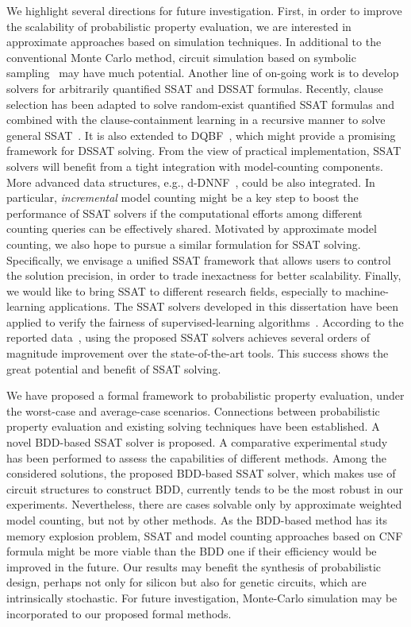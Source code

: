 We highlight several directions for future investigation.
First, in order to improve the scalability of probabilistic property evaluation,
we are interested in approximate approaches based on simulation techniques.
In additional to the conventional Monte Carlo method,
circuit simulation based on symbolic sampling~\cite{KravetsDAC19ECOSampling} may have much potential.
Another line of on-going work is to develop solvers for arbitrarily quantified SSAT and DSSAT formulas.
Recently, clause selection has been adapted to solve random-exist quantified SSAT formulas
and combined with the clause-containment learning in a recursive manner to solve general SSAT~\cite{Chen2021}.
It is also extended to DQBF~\cite{Tentrup2019},
which might provide a promising framework for DSSAT solving.
From the view of practical implementation,
SSAT solvers will benefit from a tight integration with model-counting components.
More advanced data structures, e.g., d-DNNF~\cite{Darwiche2001,Darwiche2002dDNNF}, could be also integrated.
In particular, \textit{incremental} model counting might be a key step to boost the performance of SSAT solvers
if the computational efforts among different counting queries can be effectively shared.
Motivated by approximate model counting,
we also hope to pursue a similar formulation for SSAT solving.
Specifically, we envisage a unified SSAT framework that allows users to control the solution precision,
in order to trade inexactness for better scalability.
Finally, we would like to bring SSAT to different research fields, especially to machine-learning applications.
The SSAT solvers developed in this dissertation have been applied to verify the fairness of supervised-learning algorithms~\cite{Ghosh2021}.
According to the reported data~\cite{Ghosh2021},
using the proposed SSAT solvers achieves several orders of magnitude improvement over the state-of-the-art tools.
This success shows the great potential and benefit of SSAT solving.

\iffalse
    We have proposed a formal framework to probabilistic property
    evaluation, under the worst-case and average-case scenarios.
    Connections between probabilistic property evaluation and existing
    solving techniques have been established. A novel BDD-based SSAT solver is proposed. A comparative experimental study has been performed to assess the capabilities
    of different methods. Among the considered solutions, the proposed BDD-based SSAT solver, which makes use of circuit structures to construct BDD, currently tends to be the most robust in our experiments. Nevertheless, there are cases solvable only by approximate weighted model counting, but not by other methods. As the BDD-based method has its memory explosion problem, SSAT and model
    counting approaches based on CNF formula might be more viable than the BDD one if their efficiency would be improved in the future. Our results may benefit the synthesis of probabilistic design, perhaps not only for silicon but also for genetic circuits, which are intrinsically stochastic. For future investigation, Monte-Carlo simulation may be incorporated to our proposed formal methods.

